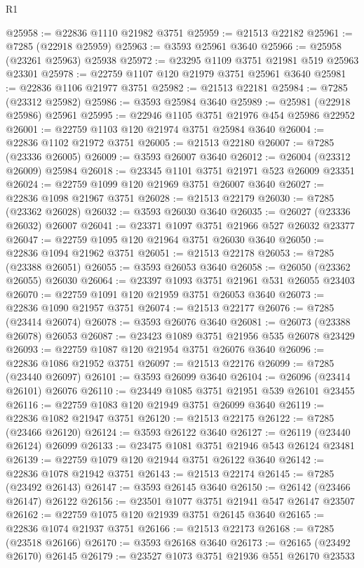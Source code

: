 \begin{lexlean}{R1}
\begin{coremodule}
@25958 := @22836 @1110 @21982 @3751
@25959 := @21513 @22182
@25961 := @7285 (@22918 @25959)
@25963 := @3593 @25961 @3640
@25966 := @25958 (@23261 @25963) @25938
@25972 := @23295 @1109 @3751 @21981 @519 @25963 @23301
@25978 := @22759 @1107 @120 @21979 @3751 @25961 @3640
@25981 := @22836 @1106 @21977 @3751
@25982 := @21513 @22181
@25984 := @7285 (@23312 @25982)
@25986 := @3593 @25984 @3640
@25989 := @25981 (@22918 @25986) @25961
@25995 := @22946 @1105 @3751 @21976 @454 @25986 @22952
@26001 := @22759 @1103 @120 @21974 @3751 @25984 @3640
@26004 := @22836 @1102 @21972 @3751
@26005 := @21513 @22180
@26007 := @7285 (@23336 @26005)
@26009 := @3593 @26007 @3640
@26012 := @26004 (@23312 @26009) @25984
@26018 := @23345 @1101 @3751 @21971 @523 @26009 @23351
@26024 := @22759 @1099 @120 @21969 @3751 @26007 @3640
@26027 := @22836 @1098 @21967 @3751
@26028 := @21513 @22179
@26030 := @7285 (@23362 @26028)
@26032 := @3593 @26030 @3640
@26035 := @26027 (@23336 @26032) @26007
@26041 := @23371 @1097 @3751 @21966 @527 @26032 @23377
@26047 := @22759 @1095 @120 @21964 @3751 @26030 @3640
@26050 := @22836 @1094 @21962 @3751
@26051 := @21513 @22178
@26053 := @7285 (@23388 @26051)
@26055 := @3593 @26053 @3640
@26058 := @26050 (@23362 @26055) @26030
@26064 := @23397 @1093 @3751 @21961 @531 @26055 @23403
@26070 := @22759 @1091 @120 @21959 @3751 @26053 @3640
@26073 := @22836 @1090 @21957 @3751
@26074 := @21513 @22177
@26076 := @7285 (@23414 @26074)
@26078 := @3593 @26076 @3640
@26081 := @26073 (@23388 @26078) @26053
@26087 := @23423 @1089 @3751 @21956 @535 @26078 @23429
@26093 := @22759 @1087 @120 @21954 @3751 @26076 @3640
@26096 := @22836 @1086 @21952 @3751
@26097 := @21513 @22176
@26099 := @7285 (@23440 @26097)
@26101 := @3593 @26099 @3640
@26104 := @26096 (@23414 @26101) @26076
@26110 := @23449 @1085 @3751 @21951 @539 @26101 @23455
@26116 := @22759 @1083 @120 @21949 @3751 @26099 @3640
@26119 := @22836 @1082 @21947 @3751
@26120 := @21513 @22175
@26122 := @7285 (@23466 @26120)
@26124 := @3593 @26122 @3640
@26127 := @26119 (@23440 @26124) @26099
@26133 := @23475 @1081 @3751 @21946 @543 @26124 @23481
@26139 := @22759 @1079 @120 @21944 @3751 @26122 @3640
@26142 := @22836 @1078 @21942 @3751
@26143 := @21513 @22174
@26145 := @7285 (@23492 @26143)
@26147 := @3593 @26145 @3640
@26150 := @26142 (@23466 @26147) @26122
@26156 := @23501 @1077 @3751 @21941 @547 @26147 @23507
@26162 := @22759 @1075 @120 @21939 @3751 @26145 @3640
@26165 := @22836 @1074 @21937 @3751
@26166 := @21513 @22173
@26168 := @7285 (@23518 @26166)
@26170 := @3593 @26168 @3640
@26173 := @26165 (@23492 @26170) @26145
@26179 := @23527 @1073 @3751 @21936 @551 @26170 @23533

\end{coremodule}
\end{lexlean}
